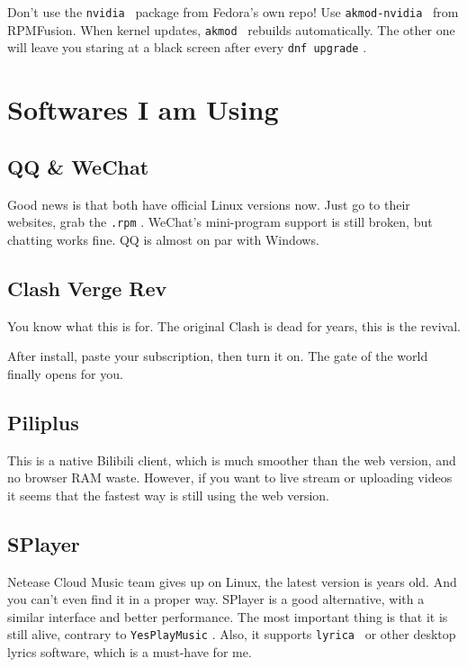 \documentclass[lang=en,color=blue,12pt]{elegantbook}
\let\oldtexttt\texttt
\renewcommand{\texttt}[1]{%
  \begingroup
  \setlength{\fboxsep}{1pt}%
  \colorbox{gray!10}{\oldtexttt{#1}}%
  \endgroup
}
\begin{document}
\begin{warning*}
Don't use the \texttt{nvidia}\ package from Fedora's own repo!
Use \texttt{akmod-nvidia}\ from RPMFusion. When kernel updates,
\texttt{akmod}\ rebuilds automatically. The other one will leave you
staring at a black screen after every \texttt{dnf\ upgrade}.
\end{warning*}

\section{\textbf{Softwares I am Using}}

\subsection{\textbf{QQ \& WeChat}}

Good news is that both have official Linux versions now. Just go to their
websites, grab the \texttt{.rpm}. WeChat's mini-program
support is still broken, but chatting works fine. QQ is almost
on par with Windows.

\subsection{\textbf{Clash Verge Rev}}

You know what this is for. The original Clash is dead for years, this is the
revival.

After install, paste your subscription, then turn it on. The gate of the world
finally opens for you.

\subsection{\textbf{Piliplus}}

This is a native Bilibili client, which is much smoother than the web version,
and no browser RAM waste. However, if you want to live stream or uploading
videos it seems that the fastest way is still using the web version.

\subsection{\textbf{SPlayer}}

Netease Cloud Music team gives up on Linux, the latest version is years old.
And you can't even find it in a proper way. SPlayer is a good alternative,
with a similar interface and better performance. The most important thing is that
it is still alive, contrary to \texttt{YesPlayMusic}. Also, it supports
\texttt{lyrica}\ or other desktop lyrics software, which is a must-have for me.
\end{document}
